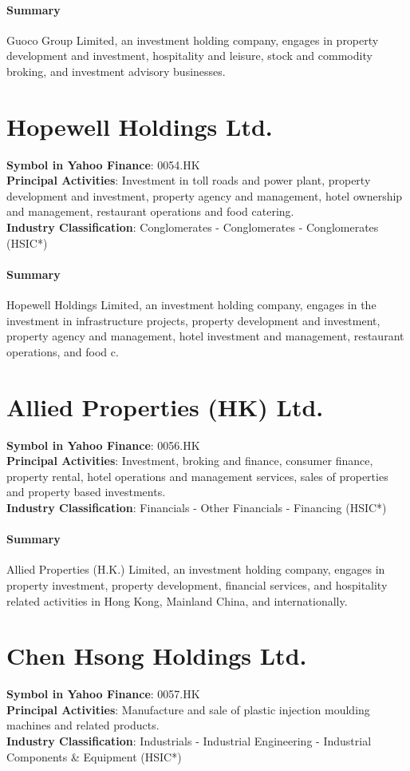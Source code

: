 \paragraph{Summary}
Guoco Group Limited, an investment holding company, engages in property development and investment, hospitality and leisure, stock and commodity broking, and investment advisory businesses.


\section{Hopewell Holdings Ltd.}
\textbf{Symbol in Yahoo Finance}: 0054.HK\\
\textbf{Principal Activities}: Investment in toll roads and power plant, property development and investment, property agency and management, hotel ownership and management, restaurant operations and food catering.\\
\textbf{Industry Classification}: Conglomerates - Conglomerates - Conglomerates (HSIC*)
\paragraph{Summary}
Hopewell Holdings Limited, an investment holding company, engages in the investment in infrastructure projects, property development and investment, property agency and management, hotel investment and management, restaurant operations, and food c.


\section{Allied Properties (HK) Ltd.}
\textbf{Symbol in Yahoo Finance}: 0056.HK\\
\textbf{Principal Activities}: Investment, broking and finance, consumer finance, property rental, hotel operations and management services, sales of properties and property based investments.\\
\textbf{Industry Classification}: Financials - Other Financials - Financing (HSIC*)
\paragraph{Summary}
Allied Properties (H.K.) Limited, an investment holding company, engages in property investment, property development, financial services, and hospitality related activities in Hong Kong, Mainland China, and internationally.


\section{Chen Hsong Holdings Ltd.}
\textbf{Symbol in Yahoo Finance}: 0057.HK\\
\textbf{Principal Activities}: Manufacture and sale of plastic injection moulding machines and related products.\\
\textbf{Industry Classification}: Industrials - Industrial Engineering - Industrial Components \& Equipment (HSIC*)
